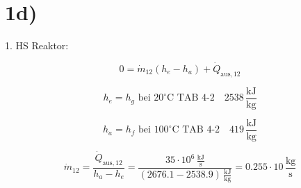 

\section*{1d)}

1. HS Reaktor:

\[
0 = \dot{m}_{12} (h_e - h_a) + \dot{Q}_{\text{aus}, 12}
\]

\[
h_e = h_g \text{ bei } 20^\circ \text{C TAB 4-2} \quad 2538 \, \frac{\text{kJ}}{\text{kg}}
\]

\[
h_a = h_f \text{ bei } 100^\circ \text{C TAB 4-2} \quad 419 \, \frac{\text{kJ}}{\text{kg}}
\]

\[
\dot{m}_{12} = \frac{\dot{Q}_{\text{aus}, 12}}{h_a - h_e} = \frac{35 \cdot 10^6 \, \frac{\text{kJ}}{\text{s}}}{(2676.1 - 2538.9) \, \frac{\text{kJ}}{\text{kg}}} = 0.255 \cdot 10 \, \frac{\text{kg}}{\text{s}}
\]